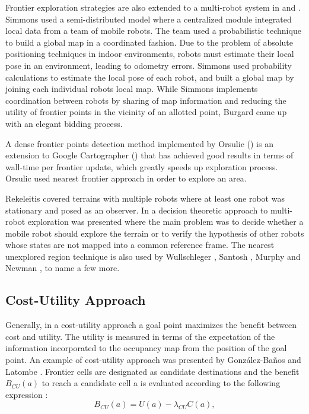 Frontier exploration strategies are also extended to a multi-robot system in \cite{Simmons2000} and \cite{Burgard2005}. Simmons \cite{Simmons2000} used a semi-distributed model where a centralized module integrated local data from a team of mobile robots. The team used a probabilistic technique to build a global map in a coordinated fashion. Due to the problem of absolute positioning techniques in indoor environments, robots must estimate their local pose in an environment, leading to odometry errors. Simmons used probability calculations to estimate the local pose of each robot, and built a global map by joining each individual robots local map. 
While Simmons \cite{Simmons2000} implements coordination between robots by sharing of map information and reducing the utility of frontier points in the vicinity of an allotted point, Burgard \cite{Burgard2005} came up with an elegant bidding process. 

A dense frontier points detection method implemented by Orsulic (\cite{Orsulic2019}) is an extension to Google Cartographer (\cite{Hess2016}) that has achieved good results in terms of wall-time per frontier update, which greatly speeds up exploration process. Orsulic used nearest frontier approach in order to explore an area. 

Rekeleitis \cite{Rekeleitis2000} covered terrains with multiple robots where at least one robot was stationary and posed as an observer. In \cite{Fox2006} a decision theoretic approach to multi-robot exploration was presented where the main problem was to decide whether a mobile robot should explore the terrain or to verify the hypothesis of other robots whose states are not mapped into a common reference frame. The nearest unexplored region technique is also used by Wullschleger \cite{Wullschleger99}, Santosh \cite{Santosh2008}, Murphy and Newman \cite{Murphy2008}, to name a few more.


\subsection{Cost-Utility Approach}

Generally, in a cost-utility approach a goal point maximizes the benefit between cost and utility. The utility is measured in terms of the expectation of the information incorporated to the occupancy map from the position of the goal point. An example of cost-utility approach was presented by González-Baños and Latombe \cite{GonzlezBaos2002}. Frontier cells are designated as candidate destinations and the benefit $B_{CU}(a)$ to reach a candidate cell a is evaluated according to the following expression \cite{Julia2012}:
\begin{equation}
B_{CU}(a) = U(a) - \lambda_{CU}C(a),
\label{equation:cost-utility}
\end{equation}

